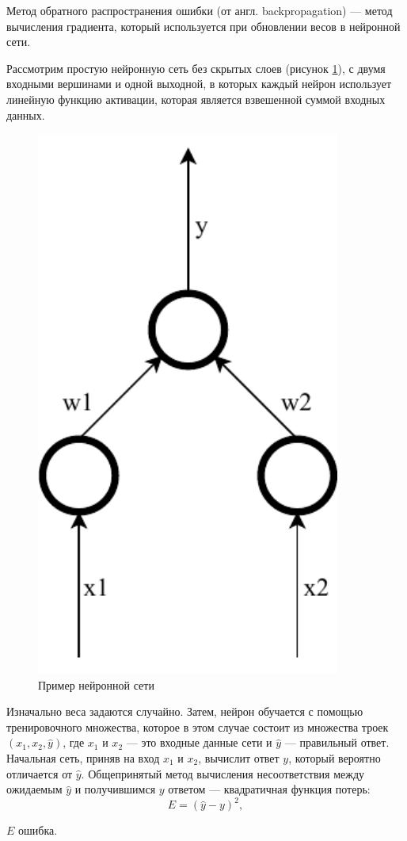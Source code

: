 Метод обратного распространения ошибки (от англ. backpropagation) --- метод вычисления градиента, который используется при обновлении весов в нейронной сети.

Рассмотрим простую нейронную сеть без скрытых слоев (рисунок \ref{fig:simple}), с двумя входными вершинами и одной выходной, в которых каждый нейрон использует линейную функцию активации, которая является взвешенной суммой входных данных.

\begin{figure}[H]
	\centering
	\includegraphics[width=100mm]{img/simple.pdf}
	\caption{Пример нейронной сети}
	\label{fig:simple}
\end{figure}

Изначально веса задаются случайно. Затем, нейрон обучается с помощью тренировочного множества, которое в этом случае состоит из множества троек $(x_1, x_2, \hat{y})$, где $x_1$ и $x_2$ --- это входные данные сети и $\hat{y}$ --- правильный ответ. Начальная сеть, приняв на вход $x_1$ и $x_2$, вычислит ответ $y$, который вероятно отличается от $\hat{y}$. Общепринятый метод вычисления несоответствия между ожидаемым $\hat{y}$ и получившимся $y$ ответом --- квадратичная функция потерь:
\begin{equation}
	\label{eq:nn4}
	E = (\hat{y}-y)^2,
\end{equation}
\begin{eqexpl}[15mm]
	\item{$E$} ошибка.
\end{eqexpl}


